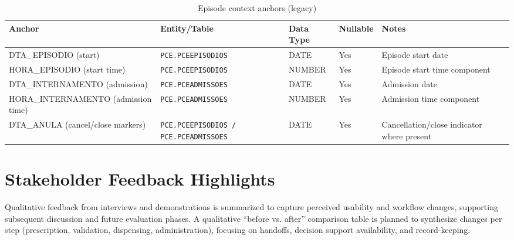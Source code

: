 \begin{table}[H]
    \centering
    \caption{Episode context anchors (legacy)}
    \label{tab:timing_episode_context}
    {\setlength{\tabcolsep}{4pt}\small\renewcommand{\arraystretch}{1.2}
    \begin{tabularx}{\textwidth}{@{}>{\raggedright\arraybackslash}p{3.6cm} >{\raggedright\arraybackslash}p{3.0cm} >{\raggedright\arraybackslash}p{2.2cm} >{\centering\arraybackslash}p{1.7cm} >{\raggedright\arraybackslash}X@{}}
        \toprule
        \textbf{Anchor} & \textbf{Entity/Table} & \textbf{Data Type} & \textbf{Nullable} & \textbf{Notes} \\
        \midrule
        DTA\_EPISODIO (start) & \texttt{PCE.PCEEPISODIOS} & DATE & Yes & Episode start date \\
        HORA\_EPISODIO (start time) & \texttt{PCE.PCEEPISODIOS} & NUMBER & Yes & Episode start time component \\
        DTA\_INTERNAMENTO (admission) & \texttt{PCE.PCEADMISSOES} & DATE & Yes & Admission date \\
        HORA\_INTERNAMENTO (admission time) & \texttt{PCE.PCEADMISSOES} & NUMBER & Yes & Admission time component \\
        DTA\_ANULA (cancel/close markers) & \texttt{PCE.PCEEPISODIOS / PCE.PCEADMISSOES} & DATE & Yes & Cancellation/close indicator where present \\
        \bottomrule
    \end{tabularx}}
\end{table}

\section{Stakeholder Feedback Highlights}
Qualitative feedback from interviews and demonstrations is summarized to capture perceived usability and workflow changes, supporting subsequent discussion and future evaluation phases. A qualitative “before vs. after” comparison table is planned to synthesize changes per step (prescription, validation, dispensing, administration), focusing on handoffs, decision support availability, and record-keeping.

